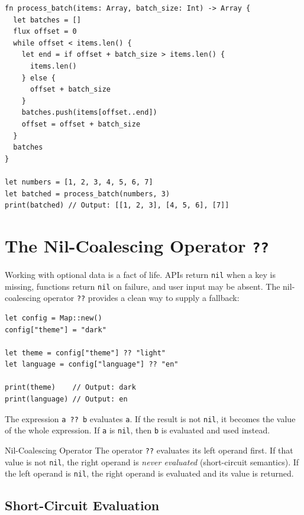 \begin{lstlisting}[language=Lattice, caption={Using ranges for batch processing}]
fn process_batch(items: Array, batch_size: Int) -> Array {
  let batches = []
  flux offset = 0
  while offset < items.len() {
    let end = if offset + batch_size > items.len() {
      items.len()
    } else {
      offset + batch_size
    }
    batches.push(items[offset..end])
    offset = offset + batch_size
  }
  batches
}

let numbers = [1, 2, 3, 4, 5, 6, 7]
let batched = process_batch(numbers, 3)
print(batched) // Output: [[1, 2, 3], [4, 5, 6], [7]]
\end{lstlisting}

\section{The Nil-Coalescing Operator \texttt{??}}\label{sec:nil-coalescing}

Working with optional data is a fact of life. APIs return \lstinline|nil| when a key is missing, functions return \lstinline|nil| on failure, and user input may be absent. The nil-coalescing operator \lstinline|??| provides a clean way to supply a fallback:

\begin{lstlisting}[language=Lattice, caption={Basic nil-coalescing}]
let config = Map::new()
config["theme"] = "dark"

let theme = config["theme"] ?? "light"
let language = config["language"] ?? "en"

print(theme)    // Output: dark
print(language) // Output: en
\end{lstlisting}

The expression \lstinline|a ?? b| evaluates \lstinline|a|. If the result is not \lstinline|nil|, it becomes the value of the whole expression. If \lstinline|a| is \lstinline|nil|, then \lstinline|b| is evaluated and used instead.

\begin{defnbox}{Nil-Coalescing Operator}
The operator \lstinline|??| evaluates its left operand first. If that value is not \lstinline|nil|, the right operand is \emph{never evaluated} (short-circuit semantics). If the left operand is \lstinline|nil|, the right operand is evaluated and its value is returned.
\end{defnbox}

\subsection{Short-Circuit Evaluation}\label{sec:nil-coalesce-short-circuit}

